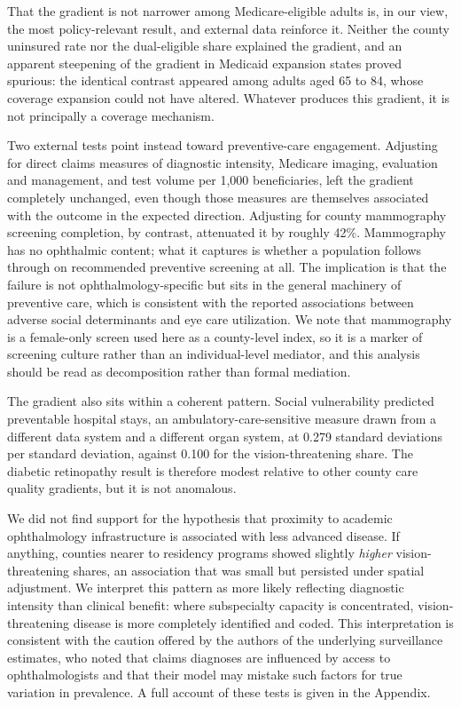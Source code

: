 \documentclass[11pt]{article}
\begin{document}
That the gradient is not narrower among Medicare-eligible adults is, in our
view, the most policy-relevant result, and external data reinforce it. Neither
the county uninsured rate nor the dual-eligible share explained the gradient,
and an apparent steepening of the gradient in Medicaid expansion states proved
spurious: the identical contrast appeared among adults aged 65 to 84, whose
coverage expansion could not have altered. Whatever produces this gradient, it
is not principally a coverage mechanism.

Two external tests point instead toward preventive-care engagement. Adjusting
for direct claims measures of diagnostic intensity, Medicare imaging,
evaluation and management, and test volume per 1,000 beneficiaries, left the
gradient completely unchanged, even though those measures are themselves
associated with the outcome in the expected direction. Adjusting for county
mammography screening completion, by contrast, attenuated it by roughly 42\%.
Mammography has no ophthalmic content; what it captures is whether a population
follows through on recommended preventive screening at all. The implication is
that the failure is not ophthalmology-specific but sits in the general
machinery of preventive care, which is consistent with the reported
associations between adverse social determinants and eye care
utilization.\citep{chaudhury2024,ravindranath2023,taccheri2023,liu2018} We note
that mammography is a female-only screen used here as a county-level index, so
it is a marker of screening culture rather than an individual-level mediator,
and this analysis should be read as decomposition rather than formal mediation.

The gradient also sits within a coherent pattern. Social vulnerability predicted
preventable hospital stays, an ambulatory-care-sensitive measure drawn from a
different data system and a different organ system, at 0.279 standard deviations
per standard deviation, against 0.100 for the vision-threatening share. The
diabetic retinopathy result is therefore modest relative to other county care
quality gradients, but it is not anomalous.

We did not find support for the hypothesis that proximity to academic
ophthalmology infrastructure is associated with less advanced disease. If
anything, counties nearer to residency programs showed slightly \emph{higher}
vision-threatening shares, an association that was small but persisted under
spatial adjustment. We interpret this pattern as more likely reflecting diagnostic
intensity than clinical benefit: where subspecialty capacity is concentrated,
vision-threatening disease is more completely identified and coded. This
interpretation is consistent with the caution offered by the authors of the
underlying surveillance estimates, who noted that claims diagnoses are
influenced by access to ophthalmologists and that their model may mistake such
factors for true variation in prevalence.\citep{lundeen2023} A full account of
these tests is given in the Appendix.
\end{document}
